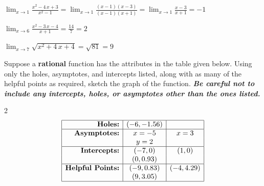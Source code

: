 \documentclass[11pt]{exam}
\newcommand{\version}{SP26A}
\begin{document}
\begin{questions}
\begin{solution}
\(\displaystyle \lim_{x \to 1} \frac{x^{2} - 4 \, x + 3}{x^{2} - 1} = \displaystyle \lim_{x \to 1} \frac{(x - 1)(x - 3)}{(x - 1)(x + 1)} = \displaystyle \lim_{x \to 1} \frac{x - 3}{x + 1} = -1\)

\(\displaystyle \lim_{x \to 6} \frac{x^{2} - 3 \, x - 4}{x + 1} = \frac{14}{7} = 2\)

\(\displaystyle \lim_{x \to 7} \sqrt{x^{2} + 4 \, x + 4} = \sqrt{81} = 9\)
\end{solution}



\calcfoot
\newpage

\blankpage
\blankpage

\nocalc{\version}

\setcounter{question}{0}


\question[3] Suppose a \textbf{rational} function has the attributes in the table given below. Using only the holes, asymptotes, and intercepts listed, along with as many of the helpful points as required, sketch the graph of the function. \textit{\textbf{Be careful not to include any intercepts, holes, or asymptotes other than the ones listed.}}\\

\begin{multicols}{2}
\renewcommand{\arraystretch}{2}
\[ \begin{array}{|r|c|c|} \hline \textbf{Holes:} & (-6, -1.56) & \\ \hline \textbf{Asymptotes:} & x = -5 & x = 3 \\ & y = 2 & \\ \hline \textbf{Intercepts:} & (-7, 0) & (1, 0) \\ & (0, 0.93) & \\ \hline \textbf{Helpful Points:} & (-9, 0.83) & (-4, 4.29) \\ & (9, 3.05) & \\ \hline \end{array} \]


\end{multicols}
\end{questions}
\end{document}

